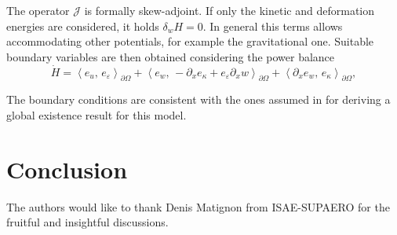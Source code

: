\documentclass{ifacconf}
\newcommand{\inner}[3][]{\ensuremath{\left\langle #2, \, #3 \right\rangle_{#1}}}
\begin{document}
The operator $\mathcal{J}$ is formally skew-adjoint. If only the kinetic and deformation energies are considered, it holds $\delta_{w} H=0$. In general this terms allows accommodating other potentials, for example the gravitational one. Suitable boundary variables are then obtained considering the power balance
\begin{equation}
	\dot{H} = \inner[\partial\Omega]{e_u}{e_\varepsilon} + \inner[\partial\Omega]{e_w}{-\partial_x e_\kappa + e_\varepsilon \partial_x w} + \inner[\partial\Omega]{\partial_x e_w}{e_\kappa},
\end{equation}

The boundary conditions are consistent with the ones assumed in \cite{puel1996} for deriving a global existence result for this model.




\section{Conclusion}

\begin{ack}
The authors would like to thank Denis Matignon from ISAE-SUPAERO for the fruitful and insightful discussions.
\end{ack}

\appendix

      
\end{document}
